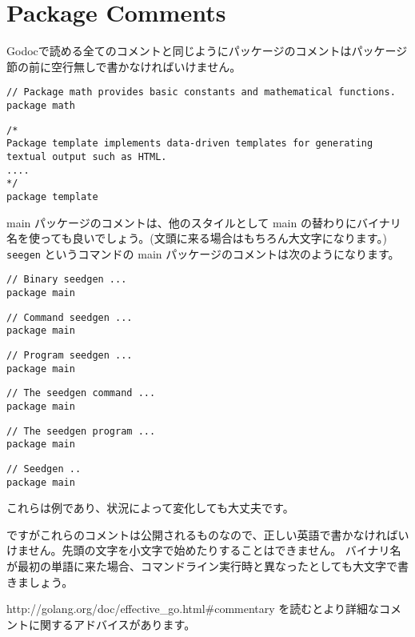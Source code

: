 \section{Package Comments}

Godocで読める全てのコメントと同じようにパッケージのコメントはパッケージ節の前に空行無しで書かなければいけません。

\begin{lstlisting}[]
// Package math provides basic constants and mathematical functions.
package math
\end{lstlisting}

\begin{lstlisting}[]
/*
Package template implements data-driven templates for generating
textual output such as HTML.
....
*/
package template
\end{lstlisting}

main パッケージのコメントは、他のスタイルとして main の替わりにバイナリ名を使っても良いでしょう。(文頭に来る場合はもちろん大文字になります。) \texttt{seegen} というコマンドの main パッケージのコメントは次のようになります。



\begin{lstlisting}[]
// Binary seedgen ...
package main
\end{lstlisting}

\begin{lstlisting}[]
// Command seedgen ...
package main
\end{lstlisting}

\begin{lstlisting}[]
// Program seedgen ...
package main
\end{lstlisting}

\begin{lstlisting}[]
// The seedgen command ...
package main
\end{lstlisting}

\begin{lstlisting}[]
// The seedgen program ...
package main
\end{lstlisting}

\begin{lstlisting}[]
// Seedgen ..
package main
\end{lstlisting}

これらは例であり、状況によって変化しても大丈夫です。

ですがこれらのコメントは公開されるものなので、正しい英語で書かなければいけません。先頭の文字を小文字で始めたりすることはできません。 バイナリ名が最初の単語に来た場合、コマンドライン実行時と異なったとしても大文字で書きましょう。

http:\//\//golang.org\//doc\//effective\_go.html\#commentary を読むとより詳細なコメントに関するアドバイスがあります。
